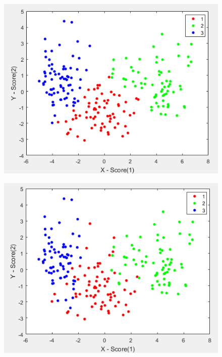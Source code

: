 \documentclass[a4paper,10pt,table]{article}
\begin{document}
\begin{figure}[h]
\centering
\begin{minipage}{.5\textwidth}
  \centering
  \includegraphics[width=.9\linewidth]{seedsnex.png}
  \label{fig:test1}
\end{minipage}%
\begin{minipage}{.5\textwidth}
  \centering
  \includegraphics[width=.9\linewidth]{seedsorg.png}
  \label{fig:test2}
\end{minipage}
\end{figure}
\newpage
\end{document}
